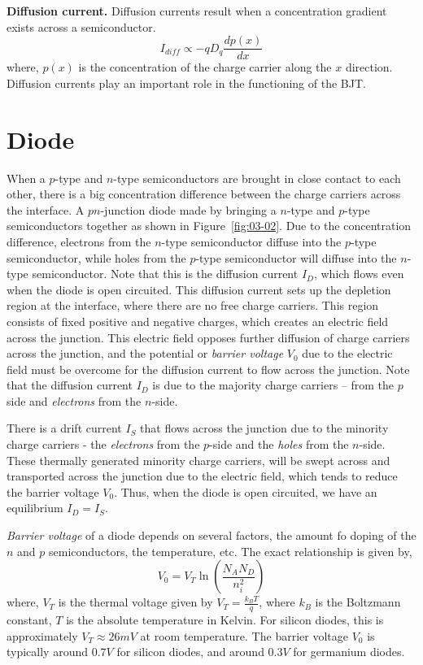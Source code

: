 \noindent\textbf{Diffusion current.} Diffusion currents result when a concentration gradient exists across a semiconductor.
\begin{equation}
    I_{diff} \propto -q D_q \frac{d p\left(x\right)}{dx}
    \label{eq:ch03-diff-current}
\end{equation}
where, $p\left(x\right)$ is the concentration of the charge carrier along the $x$ direction. Diffusion currents play an important role in the functioning of the BJT.

\section{Diode}
When a  $p$-type and $n$-type semiconductors are brought in close contact to each other, there is a big concentration difference between the charge carriers across the interface. A $pn$-junction diode made by bringing a $n$-type and $p$-type semiconductors together as shown in Figure~\ref{fig:03-02}. Due to the concentration difference, electrons from the $n$-type semiconductor diffuse into the $p$-type semiconductor, while holes from the $p$-type semiconductor will diffuse into the $n$-type semiconductor. Note that this is the diffusion current $I_D$, which flows even when the diode is open circuited. This diffusion current sets up the depletion region at the interface, where there are no free charge carriers. This region consists of fixed positive and negative charges, which creates an electric field across the junction. This electric field opposes further diffusion of charge carriers across the junction, and the potential or \textit{barrier voltage} $V_0$ due to the electric field must be overcome for the diffusion current to flow across the junction. Note that the diffusion current $I_D$ is due to the majority charge carriers --  from the $p$ side and \textit{electrons} from the $n$-side.

There is a drift current $I_S$ that flows across the junction due to the minority charge carriers - the \textit{electrons} from the $p$-side and the \textit{holes} from the $n$-side. These thermally generated minority charge carriers, will be swept across and transported across the junction due to the electric field, which tends to reduce the barrier voltage $V_0$. Thus, when the diode is open circuited, we have an equilibrium $I_D = I_S$.

\noindent\textit{Barrier voltage} of a diode depends on several factors, the amount fo doping of the $n$ and $p$ semiconductors, the temperature, etc. The exact relationship is given by,
\begin{equation}
    V_0 = V_T \ln\left(\frac{N_A N_D}{n_i^2}\right)
    \label{eq:ch03-barrier-volt}
\end{equation}
where, $V_T$ is the thermal voltage given by $V_T = \frac{k_B T}{q}$, where $k_B$ is the Boltzmann constant, $T$ is the absolute temperature in Kelvin. For silicon diodes, this is approximately $V_T \approx 26 mV$ at room temperature. The barrier voltage $V_0$ is typically around $0.7 V$ for silicon diodes, and around $0.3 V$ for germanium diodes.

